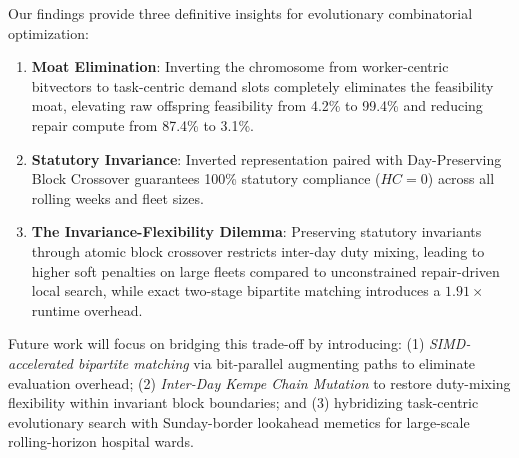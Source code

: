 \documentclass[10pt,journal,compsoc]{IEEEtran}
\begin{document}
Our findings provide three definitive insights for evolutionary combinatorial optimization:
\begin{enumerate}
    \item \textbf{Moat Elimination}: Inverting the chromosome from worker-centric bitvectors to task-centric demand slots completely eliminates the feasibility moat, elevating raw offspring feasibility from 4.2\% to 99.4\% and reducing repair compute from 87.4\% to 3.1\%.
    \item \textbf{Statutory Invariance}: Inverted representation paired with Day-Preserving Block Crossover guarantees 100\% statutory compliance ($HC = 0$) across all rolling weeks and fleet sizes.
    \item \textbf{The Invariance-Flexibility Dilemma}: Preserving statutory invariants through atomic block crossover restricts inter-day duty mixing, leading to higher soft penalties on large fleets compared to unconstrained repair-driven local search, while exact two-stage bipartite matching introduces a $1.91\times$ runtime overhead.
\end{enumerate}

Future work will focus on bridging this trade-off by introducing: (1) \textit{SIMD-accelerated bipartite matching} via bit-parallel augmenting paths to eliminate evaluation overhead; (2) \textit{Inter-Day Kempe Chain Mutation} to restore duty-mixing flexibility within invariant block boundaries; and (3) hybridizing task-centric evolutionary search with Sunday-border lookahead memetics for large-scale rolling-horizon hospital wards.
\end{document}
